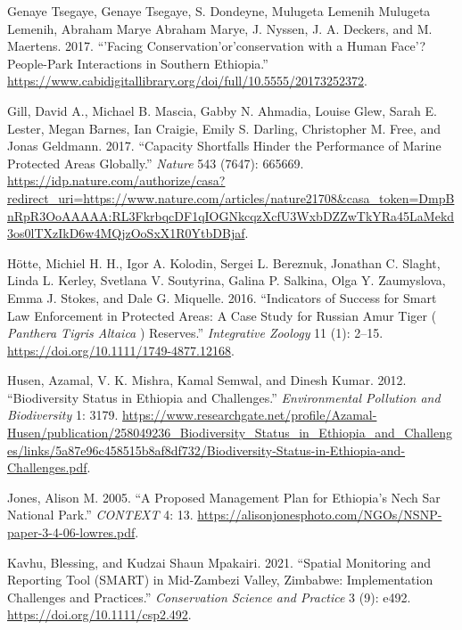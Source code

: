 \documentclass[
  letterpaper,
  DIV=11,
  numbers=noendperiod]{scrartcl}
\newlength{\cslhangindent}
\newenvironment{CSLReferences}[2] %
 {\begin{list}{}{%
  \setlength{\itemindent}{0pt}
  \setlength{\leftmargin}{0pt}
  \setlength{\parsep}{0pt}
  \ifodd #1
   \setlength{\leftmargin}{\cslhangindent}
   \setlength{\itemindent}{-1\cslhangindent}
  \fi
  \setlength{\itemsep}{#2\baselineskip}}}
 {\end{list}}
\begin{document}
\begin{CSLReferences}{1}{0}
Genaye Tsegaye, Genaye Tsegaye, S. Dondeyne, Mulugeta Lemenih Mulugeta
Lemenih, Abraham Marye Abraham Marye, J. Nyssen, J. A. Deckers, and M.
Maertens. 2017. {``'Facing Conservation'or'conservation with a Human
Face'? People-Park Interactions in Southern Ethiopia.''}
\url{https://www.cabidigitallibrary.org/doi/full/10.5555/20173252372}.

Gill, David A., Michael B. Mascia, Gabby N. Ahmadia, Louise Glew, Sarah
E. Lester, Megan Barnes, Ian Craigie, Emily S. Darling, Christopher M.
Free, and Jonas Geldmann. 2017. {``Capacity Shortfalls Hinder the
Performance of Marine Protected Areas Globally.''} \emph{Nature} 543
(7647): 665669.
\url{https://idp.nature.com/authorize/casa?redirect_uri=https://www.nature.com/articles/nature21708&casa_token=DmpBnRpR3OoAAAAA:RL3FkrbqcDF1qIOGNkcqzXcfU3WxbDZZwTkYRa45LaMekd3os0lTXzIkD6w4MQjzOoSxX1R0YtbDBjaf}.

Hötte, Michiel H. H., Igor A. Kolodin, Sergei L. Bereznuk, Jonathan C.
Slaght, Linda L. Kerley, Svetlana V. Soutyrina, Galina P. Salkina, Olga
Y. Zaumyslova, Emma J. Stokes, and Dale G. Miquelle. 2016. {``Indicators
of Success for Smart Law Enforcement in Protected Areas: A Case Study
for Russian Amur Tiger ( {\emph{Panthera Tigris Altaica}} ) Reserves.''}
\emph{Integrative Zoology} 11 (1): 2--15.
\url{https://doi.org/10.1111/1749-4877.12168}.

Husen, Azamal, V. K. Mishra, Kamal Semwal, and Dinesh Kumar. 2012.
{``Biodiversity Status in Ethiopia and Challenges.''}
\emph{Environmental Pollution and Biodiversity} 1: 3179.
\url{https://www.researchgate.net/profile/Azamal-Husen/publication/258049236_Biodiversity_Status_in_Ethiopia_and_Challenges/links/5a87e96c458515b8af8df732/Biodiversity-Status-in-Ethiopia-and-Challenges.pdf}.

Jones, Alison M. 2005. {``A Proposed Management Plan for Ethiopia{'}s
Nech Sar National Park.''} \emph{CONTEXT} 4: 13.
\url{https://alisonjonesphoto.com/NGOs/NSNP-paper-3-4-06-lowres.pdf}.

Kavhu, Blessing, and Kudzai Shaun Mpakairi. 2021. {``Spatial Monitoring
and Reporting Tool (SMART) in Mid{-}Zambezi Valley, Zimbabwe:
Implementation Challenges and Practices.''} \emph{Conservation Science
and Practice} 3 (9): e492. \url{https://doi.org/10.1111/csp2.492}.


\end{CSLReferences}
\end{document}
